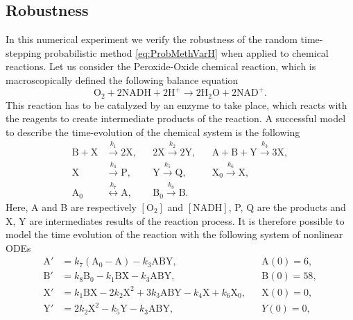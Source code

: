 \documentclass{siamart1116}
\numberwithin{theorem}{section}
\newcommand{\rightarrowtext}[1]{\ensuremath{\stackrel{#1}{\longrightarrow}}}
\newcommand{\leftrightarrowtext}[1]{\ensuremath{\stackrel{#1}{\longleftrightarrow}}}
\begin{document}
\subsection{Robustness} In this numerical experiment we verify the robustness of the random time-stepping probabilistic method \eqref{eq:ProbMethVarH} when applied to chemical reactions. Let us consider the Peroxide-Oxide chemical reaction, which is macroscopically defined the following balance equation
\begin{equation}
	\mathrm{O}_2 + 2\mathrm{NADH} + 2\mathrm{H}^+ \to 2\mathrm{H}_2\mathrm{O} + 2\mathrm{NAD}^+.
\end{equation}
This reaction has to be catalyzed by an enzyme to take place, which reacts with the reagents to create intermediate products of the reaction. A successful model \cite{Ols83} to describe the time-evolution of the chemical system is the following
\begin{equation}
\begin{aligned}
	\mathrm{B} + \mathrm{X} &\rightarrowtext{k_1} 2 \mathrm{X}, 
	&&2\mathrm{X} \rightarrowtext{k_2} 2\mathrm{Y}, 
	&&\mathrm{A} + \mathrm{B} + \mathrm{Y} \rightarrowtext{k_3} 3 \mathrm{X}, \\
	\mathrm{X} &\rightarrowtext{k_4} \mathrm{P}, 
	&&\mathrm{Y} \rightarrowtext{k_5} \mathrm{Q}, 
	&&\mathrm{X_0} \rightarrowtext{k_6} \mathrm{X}, \\
	\mathrm{A_0} &\leftrightarrowtext{k_7} \mathrm{A}, 
	&&\mathrm{B_0} \rightarrowtext{k_8} \mathrm{B}.
\end{aligned}
\end{equation}
Here, A and B are respectively $[\mathrm{O}_2]$ and $[\mathrm{NADH}]$, P, Q are the products and X, Y are intermediates results of the reaction process. It is therefore possible to model the time evolution of the reaction with the following system of nonlinear ODEs 
\begin{equation}\label{eq:PeroxOx}
\begin{aligned}
	\mathrm{A}' &= k_7  (\mathrm{A}_0 - \mathrm{A}) - k_3  \mathrm{A}\mathrm{B}\mathrm{Y}, &&\mathrm{A}(0) = 6, \\
	\mathrm{B}' &= k_8\mathrm{B}_0 - k_1  \mathrm{B}\mathrm{X} - k_3  \mathrm{A}\mathrm{B}\mathrm{Y}, &&\mathrm{B}(0) = 58, \\
	\mathrm{X}' &= k_1  \mathrm{B}\mathrm{X} - 2  k_2  \mathrm{X}^2 + 3  k_3 \mathrm{A}\mathrm{B}\mathrm{Y} - k_4  \mathrm{X} + k_6\mathrm{X}_0,&& \mathrm{X}(0) = 0, \\
	\mathrm{Y}' &= 2  k_2  \mathrm{X}^2 - k_5  \mathrm{Y} - k_3  \mathrm{A}\mathrm{B}\mathrm{Y}, && Y(0) = 0,
\end{aligned}
\end{equation}
\end{document}
